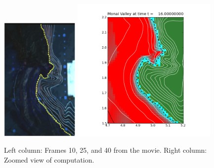 \begin{figure}[ht]
\vskip 5pt
\hfil\includegraphics[width=1.5in]{bp7/movie/Frame40.png}\hfil
\hfil\includegraphics[width=2.8in]{bp7/figs423/frame0009fig10.png}\hfil
\caption{\label{fig:bp7framesA} 
Left column: Frames 10, 25, and 40 from the movie.
Right column: Zoomed view of computation.
  }
\end{figure}


